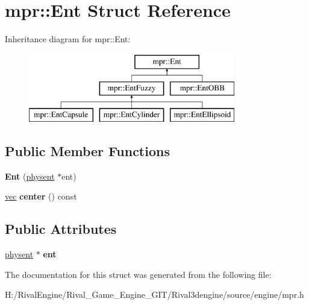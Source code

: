 \hypertarget{structmpr_1_1_ent}{}\section{mpr\+:\+:Ent Struct Reference}
\label{structmpr_1_1_ent}
Inheritance diagram for mpr\+:\+:Ent\+:\begin{figure}[H]
\begin{center}
\leavevmode
\includegraphics[height=3.000000cm]{structmpr_1_1_ent}
\end{center}
\end{figure}
\subsection*{Public Member Functions}
\begin{DoxyCompactItemize}
\item 
\mbox{\label{structmpr_1_1_ent_aa25c314a245c2de3910ccec8b77868d5}} 
{\bfseries Ent} (\hyperlink{structphysent}{physent} $\ast$ent)
\item 
\mbox{\label{structmpr_1_1_ent_a29f53969d8f5d7cb74a45cf9bef4170e}} 
\hyperlink{structvec}{vec} {\bfseries center} () const
\end{DoxyCompactItemize}
\subsection*{Public Attributes}
\begin{DoxyCompactItemize}
\item 
\mbox{\label{structmpr_1_1_ent_ab476bffba727c202b95365678c03280e}} 
\hyperlink{structphysent}{physent} $\ast$ {\bfseries ent}
\end{DoxyCompactItemize}


The documentation for this struct was generated from the following file\+:\begin{DoxyCompactItemize}
\item 
H\+:/\+Rival\+Engine/\+Rival\+\_\+\+Game\+\_\+\+Engine\+\_\+\+G\+I\+T/\+Rival3dengine/source/engine/mpr.\+h\end{DoxyCompactItemize}
